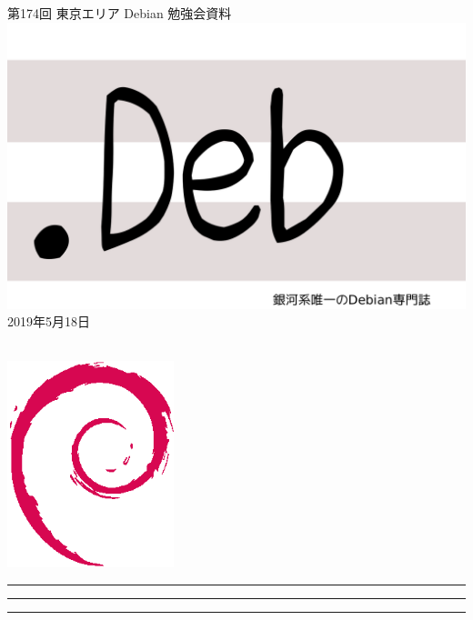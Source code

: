 \documentclass[mingoth,a4paper]{jsarticle}
\newcommand{\debmtgyear}{2019}
\newcommand{\debmtgmonth}{5}
\newcommand{\debmtgdate}{18}
\newcommand{\debmtgnumber}{174}
\begin{document}
\begin{titlepage}
\thispagestyle{empty}

\vspace*{-2cm}
第\debmtgnumber{}回 東京エリア Debian 勉強会資料\\
\hspace*{-2cm}
\includegraphics{image2012-natsu/dotdeb.pdf}\\
\hfill{}\debmtgyear{}年\debmtgmonth{}月\debmtgdate{}日

\\

\vspace*{-2cm}
\hfill{}\includegraphics[height=6cm]{image200502/openlogo-nd.eps}
\end{titlepage}

\newpage

\begin{minipage}[b]{0.2\hsize}
 \colorbox{titleback}{}
\end{minipage}
\begin{minipage}[b]{0.8\hsize}
\hrule
\vspace{2mm}
\hrule
\begin{multicols}{2}
\tableofcontents
\end{multicols}
\vspace{2mm}
\hrule
\end{minipage}
\end{document}
